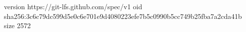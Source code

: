 version https://git-lfs.github.com/spec/v1
oid sha256:3c6c79dc599d5e0c6e701e9d4080223efe7b5c0990b5cc749b25fba7a2cda41b
size 2572
